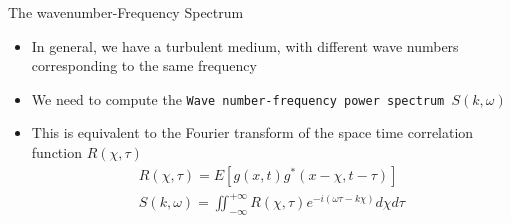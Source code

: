 \documentclass[t,10pt]{beamer}
\begin{document}
\begin{frame}{The wavenumber-Frequency Spectrum}
\begin{itemize}[<+->]
\item In general, we have a turbulent medium, with different wave
  numbers corresponding to the same frequency
\item We need to compute the \textcolor{tachameleon}{\texttt{Wave
      number-frequency power spectrum $S(k,\omega)$}}
\item This is equivalent to the Fourier transform of the space time
  correlation function $R(\chi,\tau)$
\begin{gather*}
R(\chi,\tau) = E[g(x,t)g^{*}(x-\chi,t-\tau)] \\
S(k,\omega)
=\iint_{-\infty}^{+\infty}R(\chi,\tau)e^{-i(\omega\tau-k\chi)}d\chi d\tau
\end{gather*}

\end{itemize}

\end{frame}
\end{document}
